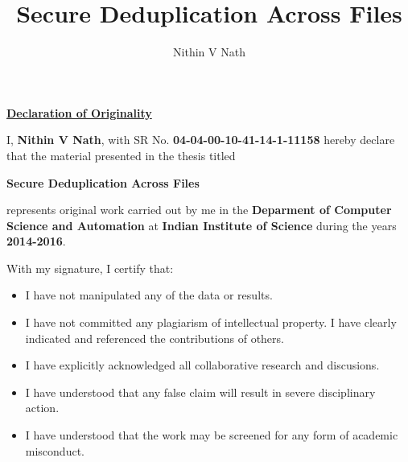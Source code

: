 \documentclass[oneside,12pt]{IIScthesisPSnPDF}
\begin{document}
\title{Secure Deduplication Across Files} 

\submitdate{\monthyeardate\today} 
\me
\author{Nithin V Nath}



\maketitle


\begin{center}
\LARGE{\underline{\textbf{Declaration of Originality}}}
\end{center}
\noindent I, \textbf{Nithin V Nath}, with SR No. \textbf{04-04-00-10-41-14-1-11158} hereby declare that
the material presented in the thesis titled

\begin{center}
\textbf{Secure Deduplication Across Files}
\end{center}

\noindent represents original work carried out by me in the \textbf{Deparment
of Computer Science and Automation} at \textbf{Indian Institute of
Science} during the years \textbf{2014-2016}.

\noindent With my signature, I certify that:
\begin{itemize}
	\item I have not manipulated any of the data or results.
	\item I have not committed any plagiarism of intellectual
	property.
	I have clearly indicated and referenced the contributions of
	others.
	\item I have explicitly acknowledged all collaborative research
	and discusions.
	\item I have understood that any false claim will result in severe
	disciplinary action.
	\item I have understood that the work may be screened for any form
	of academic misconduct.
\end{itemize}

\vspace{20mm}

 \qquad

\vspace{20mm}
\end{document}
